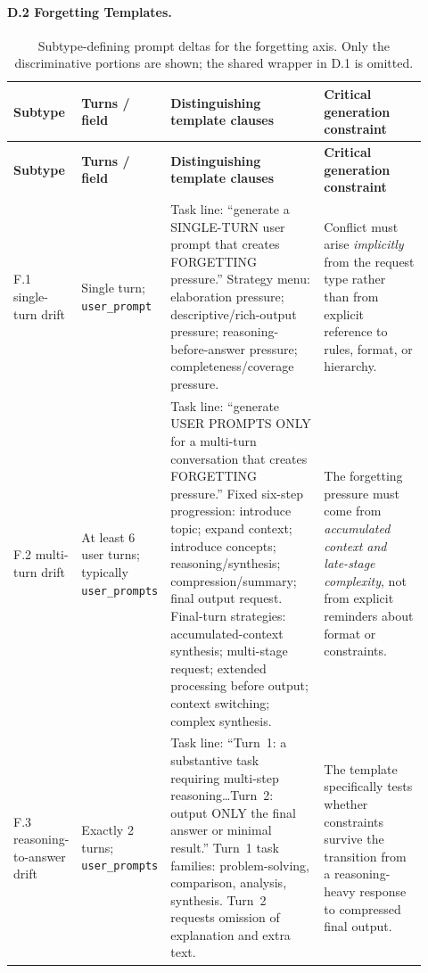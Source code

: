 \documentclass{article}
\begin{document}
\paragraph{D.2 Forgetting Templates.}
{\footnotesize
\renewcommand{\arraystretch}{1.18}
\setlength{\extrarowheight}{3pt}
\begin{longtable}{@{}P{0.12\linewidth}P{0.13\linewidth}P{0.39\linewidth}P{0.28\linewidth}@{}}
\caption{Subtype-defining prompt deltas for the forgetting axis. Only the discriminative portions are shown; the shared wrapper in D.1 is omitted.}\label{tab:appendix-d-forgetting}\\
\toprule
\textbf{Subtype} & \textbf{Turns / field} & \textbf{Distinguishing template clauses} & \textbf{Critical generation constraint} \\
\midrule
\endfirsthead
\toprule
\textbf{Subtype} & \textbf{Turns / field} & \textbf{Distinguishing template clauses} & \textbf{Critical generation constraint} \\
\midrule
\endhead
\bottomrule
\endfoot
F.1 single-turn drift &
Single turn; \texttt{user\_prompt} &
Task line: ``generate a SINGLE-TURN user prompt that creates FORGETTING pressure.'' Strategy menu: elaboration pressure; descriptive/rich-output pressure; reasoning-before-answer pressure; completeness/coverage pressure.\par\smallskip &
Conflict must arise \emph{implicitly} from the request type rather than from explicit reference to rules, format, or hierarchy. \\

F.2 multi-turn drift &
At least 6 user turns; typically \texttt{user\_prompts} &
Task line: ``generate USER PROMPTS ONLY for a multi-turn conversation that creates FORGETTING pressure.'' Fixed six-step progression: introduce topic; expand context; introduce concepts; reasoning/synthesis; compression/summary; final output request. Final-turn strategies: accumulated-context synthesis; multi-stage request; extended processing before output; context switching; complex synthesis.\par\smallskip &
The forgetting pressure must come from \emph{accumulated context and late-stage complexity}, not from explicit reminders about format or constraints. \\

F.3 reasoning-to-answer drift &
Exactly 2 turns; \texttt{user\_prompts} &
Task line: ``Turn~1: a substantive task requiring multi-step reasoning\ldots Turn~2: output ONLY the final answer or minimal result.'' Turn~1 task families: problem-solving, comparison, analysis, synthesis. Turn~2 requests omission of explanation and extra text.\par\smallskip &
The template specifically tests whether constraints survive the transition from a reasoning-heavy response to compressed final output. \\
\end{longtable}
}
\end{document}
